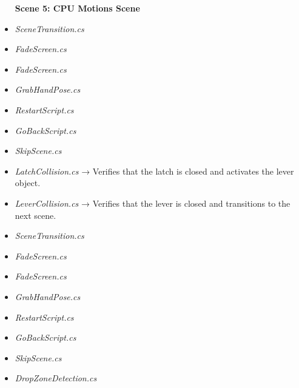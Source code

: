 \documentclass[10pt,twocolumn]{article}
\begin{document}
\begin{itemize}
    \textbf{Scene 5: CPU Motions Scene}\\
    \item \textit{SceneTransition.cs}\\
    \item \textit{FadeScreen.cs}
\end{itemize}

\begin{itemize}
    \textbf{Scene 6:  CPU Install Scene}\\
    \item \textit{FadeScreen.cs}\\
    \item \textit{GrabHandPose.cs}\\
    \item \textit{RestartScript.cs}\\
    \item \textit{GoBackScript.cs}\\
    \item \textit{SkipScene.cs}\\
    \item \textit{LatchCollision.cs} → Verifies that the latch is closed and activates the lever object.\\
    \item \textit{LeverCollision.cs} →  Verifies that the lever is closed and transitions to the next scene. 
\end{itemize}

\begin{itemize}
    \textbf{Scene 7:  Cooler Informational Scene}\\
    \item \textit{SceneTransition.cs}\\
    \item \textit{FadeScreen.cs}
\end{itemize}

\begin{itemize}
    \textbf{Scene 8:  Cooler Placement Scene}\\
    \item \textit{FadeScreen.cs}\\
    \item \textit{GrabHandPose.cs}\\
    \item \textit{RestartScript.cs}\\
    \item \textit{GoBackScript.cs}\\
    \item \textit{SkipScene.cs}\\
    \item \textit{DropZoneDetection.cs} 
\end{itemize}
\end{document}
